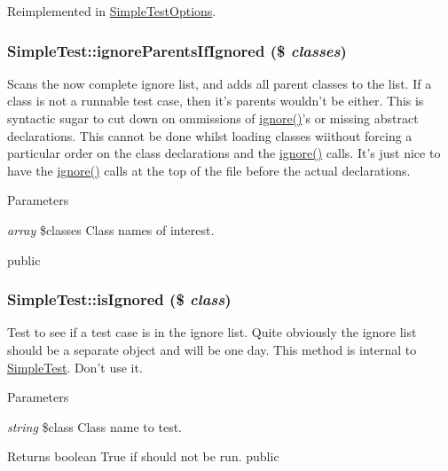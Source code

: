 Reimplemented in \hyperlink{class_simple_test_options_af46d33a1d67a45e554dce91b44d78aed}{SimpleTestOptions}.\hypertarget{class_simple_test_af1f16dee501b6f17715087395b8f47cf}{
\subsubsection[{ignoreParentsIfIgnored}]{\setlength{\rightskip}{0pt plus 5cm}SimpleTest::ignoreParentsIfIgnored (\$ {\em classes})}}
\label{class_simple_test_af1f16dee501b6f17715087395b8f47cf}
Scans the now complete ignore list, and adds all parent classes to the list. If a class is not a runnable test case, then it's parents wouldn't be either. This is syntactic sugar to cut down on ommissions of \hyperlink{class_simple_test_ad50fcd3215d2e5166c41bc73cef1bbe6}{ignore()}'s or missing abstract declarations. This cannot be done whilst loading classes wiithout forcing a particular order on the class declarations and the \hyperlink{class_simple_test_ad50fcd3215d2e5166c41bc73cef1bbe6}{ignore()} calls. It's just nice to have the \hyperlink{class_simple_test_ad50fcd3215d2e5166c41bc73cef1bbe6}{ignore()} calls at the top of the file before the actual declarations. 
\begin{DoxyParams}{Parameters}
\item[{\em array}]\$classes Class names of interest.\end{DoxyParams}
public \hypertarget{class_simple_test_a95bdcb7e0f83f70790ffc4566158824d}{
\subsubsection[{isIgnored}]{\setlength{\rightskip}{0pt plus 5cm}SimpleTest::isIgnored (\$ {\em class})}}
\label{class_simple_test_a95bdcb7e0f83f70790ffc4566158824d}
Test to see if a test case is in the ignore list. Quite obviously the ignore list should be a separate object and will be one day. This method is internal to \hyperlink{class_simple_test}{SimpleTest}. Don't use it. 
\begin{DoxyParams}{Parameters}
\item[{\em string}]\$class Class name to test. \end{DoxyParams}
\begin{DoxyReturn}{Returns}
boolean True if should not be run.  public 
\end{DoxyReturn}


